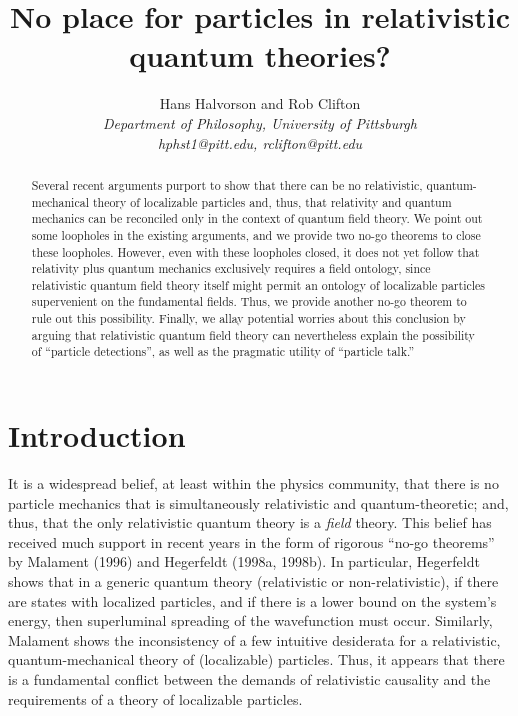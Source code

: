 \documentclass[11pt]{article}
\title{No place for particles in relativistic quantum theories?}
\author{Hans Halvorson and Rob Clifton \\
{\small {\it Department of Philosophy, University of Pittsburgh }} \\
{\small {\it hphst1@pitt.edu, rclifton@pitt.edu }}}
\date{}
\theoremstyle{remark}
\begin{document}
\maketitle 
\begin{abstract} Several recent arguments purport to show that 
  there can be no relativistic, quantum-mechanical theory of
  localizable particles and, thus, that relativity and quantum
  mechanics can be reconciled only in the context of quantum field
  theory.  We point out some loopholes in the existing arguments, and
  we provide two no-go theorems to close these loopholes.  However,
  even with these loopholes closed, it does not yet follow that
  relativity plus quantum mechanics exclusively requires a field
  ontology, since relativistic quantum field theory itself might
  permit an ontology of localizable particles supervenient on the
  fundamental fields.  Thus, we provide another no-go theorem to rule
  out this possibility.  Finally, we allay potential worries about
  this conclusion by arguing that relativistic quantum field theory
  can nevertheless explain the possibility of ``particle detections'',
  as well as the pragmatic utility of ``particle talk.''
\end{abstract}

\section{Introduction}
It is a widespread belief, at least within the physics community, that
there is no particle mechanics that is simultaneously relativistic and
quantum-theoretic; and, thus, that the only relativistic quantum
theory is a \emph{field} theory.  This belief has received much
support in recent years in the form of rigorous ``no-go theorems'' by
Malament (1996) and Hegerfeldt (1998a, 1998b).  In particular,
Hegerfeldt shows that in a generic quantum theory (relativistic or
non-relativistic), if there are states with localized particles, and
if there is a lower bound on the system's energy, then superluminal
spreading of the wavefunction must occur.  Similarly, Malament shows
the inconsistency of a few intuitive desiderata for a relativistic,
quantum-mechanical theory of (localizable) particles.  Thus, it
appears that there is a fundamental conflict between the demands of
relativistic causality and the requirements of a theory of localizable
particles.
\end{document}
